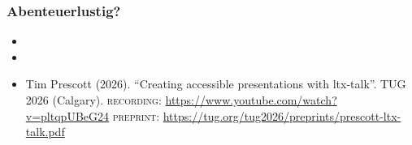 \documentclass{ltx-talk}
\begin{document}
%
%  
%
%
%
%  
%
%
\begin{frame}
  \frametitle{Abenteuerlustig?}
  \begin{itemize}
    \item {}
    \item {}
    \item Tim Prescott (2026). \enquote{Creating accessible presentations with ltx-talk}. TUG 2026 (Calgary). \textsc{recording:} \url{https://www.youtube.com/watch?v=pltqpUBeG24}
    \linebreak\textsc{preprint:} \url{https://tug.org/tug2026/preprints/prescott-ltx-talk.pdf}
  \end{itemize}
\end{frame}
\end{document}
